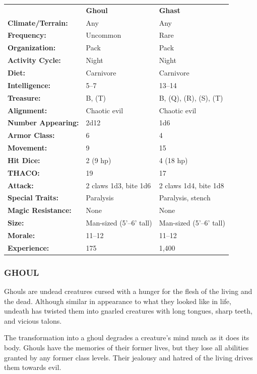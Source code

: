 \begin{multicols}{2}
\begin{minipage}{\columnwidth}
\noindent \begin{tabular}{p{}g{.24\columnwidth}p{.24\columnwidth}}
	& \textbf{Ghoul}	& \textbf{Ghast}	\\
\textbf{Climate/Terrain:}	& Any	& Any \\
\textbf{Frequency:} 		& Uncommon	& Rare \\
\textbf{Organization:} 		& Pack	& Pack \\
\textbf{Activity Cycle:} 	& Night	& Night \\
\textbf{Diet:} 				& Carnivore	& Carnivore \\
\textbf{Intelligence:} 		& 5--7	& 13--14 \\
\textbf{Treasure:} 			& B, (T)	& B, (Q), (R), (S), (T) \\
\textbf{Alignment:} 		& Chaotic evil	& Chaotic evil \\
\hline
\textbf{Number Appearing:} 	& 2d12	& 1d6 \\
\textbf{Armor Class:} 		& 6	& 4 \\
\textbf{Movement:} 			& 9	& 15 \\
\textbf{Hit Dice:} 			& 2 (9 hp)	& 4 (18 hp)	\\
\textbf{THACO:} 			& 19	& 17 \\
\textbf{Attack:} 			& 2 claws 1d3, bite 1d6	& 2 claws 1d4, bite 1d8 \\
\textbf{Special Traits:} & Paralysis	& Paralysis, stench \\
\textbf{Magic Resistance:} 	& None	& None \\
\textbf{Size:} 				& Man-sized (5'--6' tall)	& Man-sized (5'--6' tall) \\
\textbf{Morale:} 			& 11--12	& 11--12 \\
\textbf{Experience:} 		& 175	& 1,400 \\ %
\end{tabular}

\end{minipage}

\subsubsection{GHOUL}

Ghouls are undead creatures cursed with a hunger for the flesh of the living and the dead. Although similar in appearance to what they looked like in life, undeath has twisted them into gnarled creatures with long tongues, sharp teeth, and vicious talons.

The transformation into a ghoul degrades a creature's mind much as it does its body. Ghouls have the memories of their former lives, but they lose all abilities granted by any former class levels. Their jealousy and hatred of the living drives them towards evil.


\end{multicols}
